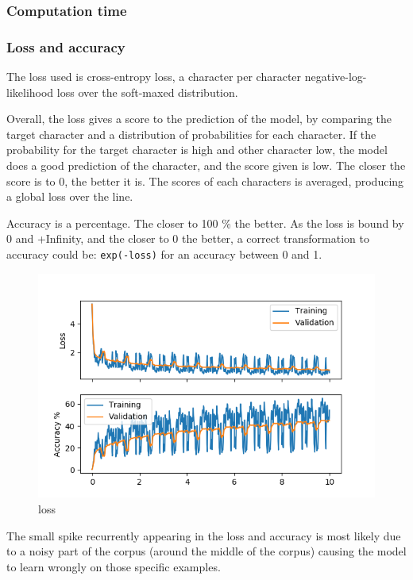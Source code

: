 \subsubsection{Computation time}

\subsubsection{Loss and accuracy}

The loss used is cross-entropy loss, a character per character
negative-log-likelihood loss over the soft-maxed distribution.

Overall, the loss gives a score to the prediction of the model, by
comparing the target character and a distribution of probabilities for
each character. If the probability for the target character is high and
other character low, the model does a good prediction of the character,
and the score given is low. The closer the score is to 0, the better it
is. The scores of each characters is averaged, producing a global loss
over the line.

Accuracy is a percentage. The closer to 100 \% the better. As the loss
is bound by 0 and +Infinity, and the closer to 0 the better, a correct
transformation to accuracy could be: \lstinline!exp(-loss)! for an
accuracy between 0 and 1.

\begin{figure}[ht]
\centering
\includegraphics{parts/appendix/reports-papud/2018_07_09-Basic_implementation_results/loss.png}
\caption{loss}
\end{figure}

The small spike recurrently appearing in the loss and accuracy is most
likely due to a noisy part of the corpus (around the middle of the
corpus) causing the model to learn wrongly on those specific examples.

